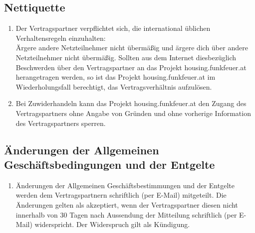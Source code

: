 \documentclass[parskip=half]{article}
\begin{document}
\subsection{Nettiquette}
\begin{enumerate}
\item Der Vertragspartner verpflichtet sich, die international üblichen Verhaltensregeln einzuhalten: \\
Ärgere andere Netzteilnehmer nicht übermäßig und ärgere dich über andere
Netzteilnehmer nicht übermäßig. Sollten aus dem Internet diesbezüglich Beschwerden über
den Vertragspartner an das Projekt housing.funkfeuer.at herangetragen werden, so ist das Projekt
housing.funkfeuer.at im Wiederholungsfall berechtigt, das Vertragsverhältnis aufzulösen.
\item Bei Zuwiderhandeln kann das Projekt housing.funkfeuer.at den Zugang des
Vertragspartners ohne Angabe von Gründen und ohne vorherige Information des
Vertragspartners sperren.
\end{enumerate}

\subsection{Änderungen der Allgemeinen Geschäftsbedingungen und der Entgelte}
\begin{enumerate}
\item[] Änderungen der Allgemeinen Geschäftsbestimmungen und der Entgelte werden dem
Vertragspartnern schriftlich (per E-Mail) mitgeteilt. Die Änderungen gelten als akzeptiert,
wenn der Vertragspartner diesen nicht innerhalb von 30 Tagen nach Aussendung der
Mitteilung schriftlich (per E-Mail) widerspricht. Der Widerspruch gilt als Kündigung.
\end{enumerate}
\end{document}
